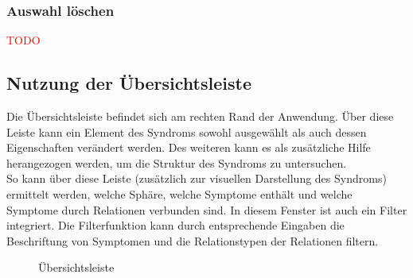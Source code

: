 \documentclass[enabledeprecatedfontcommands,fontsize=11pt,paper=a4,twoside]{scrartcl}
\newcommand*{\red}{\textcolor{red}}
\newcounter{one}
\begin{document}
	\subsubsection{Auswahl löschen}
	\red{TODO}
	
		\newpage
		\subsection{Nutzung der Übersichtsleiste} \label{overwiew}
		Die Übersichtsleiste befindet sich am rechten Rand der Anwendung. Über diese Leiste kann ein Element des Syndroms sowohl ausgewählt als auch dessen Eigenschaften verändert werden. Des weiteren kann es als zusätzliche Hilfe herangezogen werden, um die Struktur des Syndroms zu untersuchen. \\
		So kann über diese Leiste (zusätzlich zur visuellen Darstellung des Syndroms) ermittelt werden, welche Sphäre, welche Symptome enthält und welche Symptome durch Relationen verbunden sind. In diesem Fenster ist auch ein Filter integriert. Die Filterfunktion kann durch entsprechende Eingaben die Beschriftung von Symptomen und die Relationstypen der Relationen filtern.
		
		\begin{figure}[ht!]
			\centering
			\caption{Übersichtsleiste}
			
		\end{figure}


\end{document}
